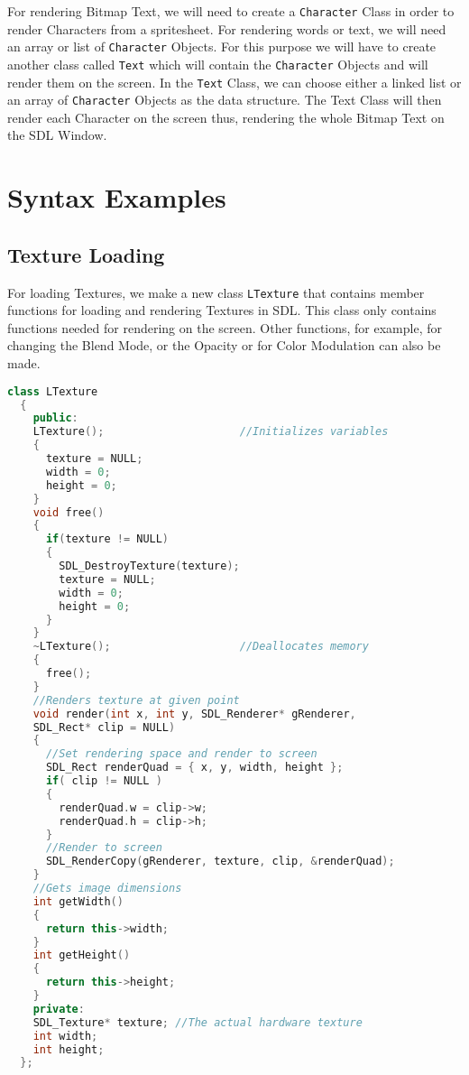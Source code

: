 \documentclass[11pt,fleqn]{book} %
\begin{document}
For rendering Bitmap Text, we will need to create a \texttt{Character} Class in order to render Characters from a spritesheet. For rendering words or text, we will need an array or list of \texttt{Character} Objects. For this purpose we will have to create another class called \texttt{Text} which will contain the \texttt{Character} Objects and will render them on the screen. In the \texttt{Text} Class, we can choose either a linked list or an array of \texttt{Character} Objects as the data structure. The Text Class will then render each Character on the screen thus, rendering the whole Bitmap Text on the SDL Window.

\section{Syntax Examples}

\subsection{Texture Loading}

For loading Textures, we make a new class \texttt{LTexture} that contains member functions for loading and rendering Textures in SDL. This class only contains functions needed for rendering on the screen. Other functions, for example, for changing the Blend Mode, or the Opacity or for Color Modulation can also be made.


\begin{lstlisting}[language=C++, caption={Default, Overloaded and Copy Constructors}]
  class LTexture
  {
    public:
    LTexture();                     //Initializes variables
    {
      texture = NULL;
      width = 0;
      height = 0;
    }
    void free()
    {
      if(texture != NULL)
      {
        SDL_DestroyTexture(texture);
        texture = NULL;
        width = 0;
        height = 0;
      }
    }
    ~LTexture();                    //Deallocates memory
    {
      free();
    }
    //Renders texture at given point
    void render(int x, int y, SDL_Renderer* gRenderer,
    SDL_Rect* clip = NULL)
    {
      //Set rendering space and render to screen
      SDL_Rect renderQuad = { x, y, width, height };
      if( clip != NULL )
      {
        renderQuad.w = clip->w;
        renderQuad.h = clip->h;
      }
      //Render to screen
      SDL_RenderCopy(gRenderer, texture, clip, &renderQuad);
    }
    //Gets image dimensions
    int getWidth()
    {
      return this->width;
    }
    int getHeight()
    {
      return this->height;
    }
    private:
    SDL_Texture* texture; //The actual hardware texture
    int width;
    int height;
  };
\end{lstlisting}
\end{document}

